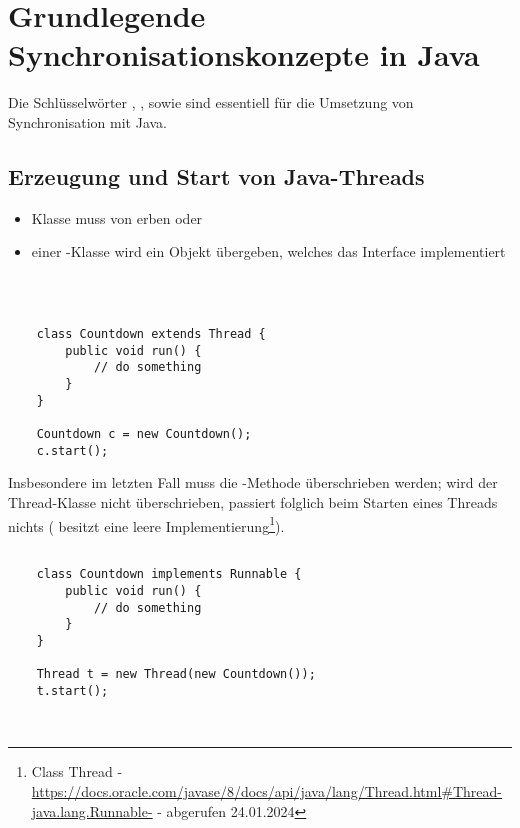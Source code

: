 \section{Grundlegende Synchronisationskonzepte in Java}

Die Schlüsselwörter , ,  sowie  sind essentiell für die Umsetzung von Synchronisation mit Java.

\subsection{Erzeugung und Start von Java-Threads}

\begin{itemize}
    \item Klasse muss von  erben oder
    \item einer -Klasse wird ein Objekt übergeben, welches das Interface  implementiert
\end{itemize}\\

\begin{verbatim}

    class Countdown extends Thread {
        public void run() {
            // do something
        }
    }

    Countdown c = new Countdown();
    c.start();
\end{verbatim}


Insbesondere im letzten Fall muss die -Methode überschrieben werden; wird  der Thread-Klasse nicht überschrieben, passiert folglich beim Starten eines Threads nichts ( besitzt eine leere Implementierung\footnote{
    Class Thread - \url{https://docs.oracle.com/javase/8/docs/api/java/lang/Thread.html#Thread-java.lang.Runnable-} - abgerufen 24.01.2024
}).

\begin{verbatim}

    class Countdown implements Runnable {
        public void run() {
            // do something
        }
    }

    Thread t = new Thread(new Countdown());
    t.start();

\end{verbatim}\\

